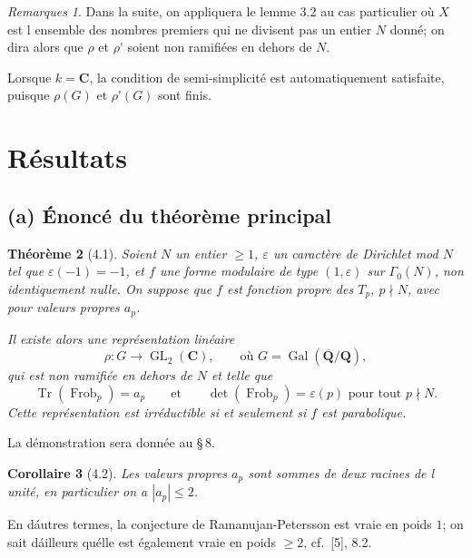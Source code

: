 \documentclass[11pt]{amsart}
\theoremstyle{plain}
\newtheorem{theoreme}{Théorème}[section]
\newtheorem{corollaire}[theoreme]{Corollaire}
\theoremstyle{definition}
\theoremstyle{remark}
\newtheorem{remarques}[theoreme]{Remarques}
\DeclareMathOperator{\Gal}{Gal}
\DeclareMathOperator{\GL}{GL}
\DeclareMathOperator{\Tr}{Tr}
\DeclareMathOperator{\frob}{Frob}
\newcommand{\Q}{\mathbf{Q}}
\newcommand{\C}{\mathbf{C}}
\begin{document}
\begin{remarques}
\item[3.3.] Dans la suite, on appliquera le lemme 3.2 au cas particulier o\`u $X$ est l ensemble des nombres premiers qui ne divisent pas un entier $N$ donn\'e; on dira alors que $\rho$ et $\rho$\'{} soient non ramifi\'ees en dehors de $N$.
\item[3.4.] Lorsque $k = \C$, la condition de semi-simplicit\'e est automatiquement satisfaite, puisque $\rho(G)$ et $\rho$\'{}$(G)$ sont finis.
\end{remarques}

\section{R\'esultats}

\subsection*{(a) \'Enonc\'e du th\'eor\`eme principal}

\begin{theoreme}[4.1]
Soient $N$ un entier $\ge 1$, $\varepsilon$ un caract\`ere de Dirichlet mod $N$ tel que $\varepsilon(-1) = -1$, et $f$ une forme modulaire de type $(1, \varepsilon)$ sur $\Gamma_0(N)$, non identiquement nulle. On suppose que $f$ est fonction propre des $T_p$, $p \nmid N$, avec pour valeurs propres $a_p$.

Il existe alors une repr\'esentation lin\'eaire
$$\rho : G \longrightarrow \GL_2(\C), \qquad \text{o\`u } G = \Gal(\overline{\Q}/\Q),$$
qui est non ramifi\'ee en dehors de $N$ et telle que
\begin{equation}\label{eq:mainthm}\Tr(\frob_p) = a_p \qquad \text{et} \qquad \det(\frob_p) = \varepsilon(p) \text{ pour tout } p \nmid N.\end{equation}
Cette repr\'esentation est irr\'eductible si et seulement si $f$ est parabolique.
\end{theoreme}

La d\'emonstration sera donn\'ee au \S\,8.

\begin{corollaire}[4.2]
Les valeurs propres $a_p$ sont sommes de deux racines de l unit\'e, en particulier on a $|a_p| \le 2$.
\end{corollaire}

En d\'autres termes, la conjecture de Ramanujan-Petersson est vraie en poids $1$; on sait d\'ailleurs qu\'elle est \'egalement vraie en poids $\ge 2$, cf.~[5], 8.2.
\end{document}
